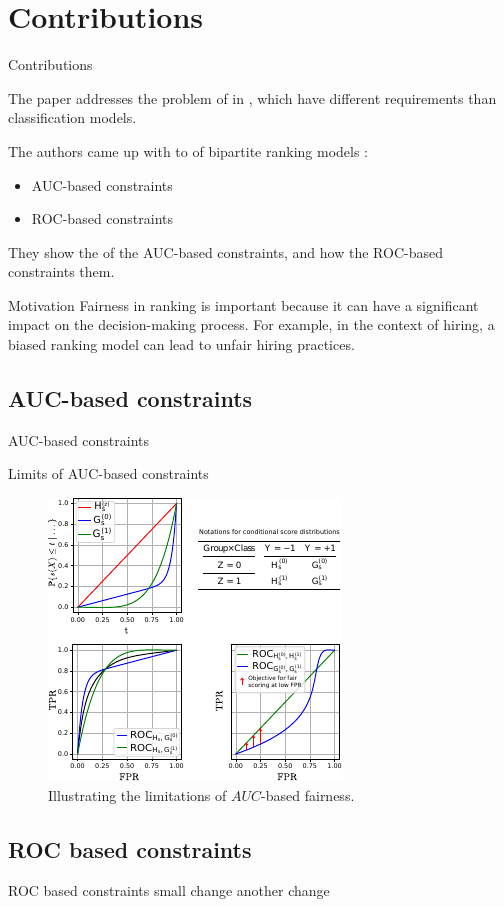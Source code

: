 \section{Contributions}
\begin{frame}{Contributions}

    The paper addresses the problem of  in , which have different requirements than classification models.
    
    The authors came up with  to  of bipartite ranking models :
  \begin{itemize}
      \item AUC-based constraints
      \item ROC-based constraints
  \end{itemize}
  
  They show the  of the AUC-based constraints, and how the ROC-based constraints  them.
\end{frame}

\begin{frame}{Motivation}
    Fairness in ranking is important because it can have a significant impact on the decision-making process. For example, in the context of hiring, a biased ranking model can lead to unfair hiring practices.
\end{frame}


\subsection{AUC-based constraints}
\begin{frame}{AUC-based constraints}

\end{frame}

\begin{frame}{Limits of AUC-based constraints}
    \begin{figure}[t]
        \centering
        \includegraphics[width=0.6\columnwidth]{images/original_paper/example_simple_dists_explained_with_table2.pdf}
        \caption{Illustrating the limitations of $AUC$-based fairness.}
        \label{fig:example-1}
    \end{figure}
\end{frame}

\subsection{ROC based constraints}
\begin{frame}{ROC based constraints}
    small change another change
\end{frame}
